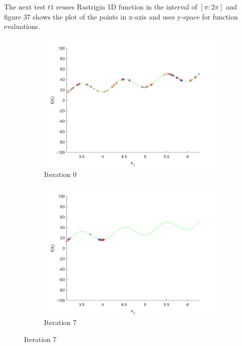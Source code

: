 \par The next test $t1$ reuses Rastrigin 1D function in the interval of $[\pi:2\pi]$ and figure 37 shows the plot of the points in x-axis and uses y-space for function evaluations.

\begin{figure}
 \begin{subfigure}[b]{0.4\textwidth}
   \includegraphics[width=\textwidth]{img/smpl/rast1dshft/loa-iter-0}
   \caption{Iteration 0}
   \label{fig:s3-iter-0}
 \end{subfigure}
 \begin{subfigure}[b]{0.4\textwidth}
   \includegraphics[width=\textwidth]{img/smpl/rast1dshft/loa-iter-7}
   \caption{Iteration 7}

\end{subfigure}
\end{figure}
